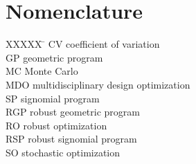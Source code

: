 \section*{Nomenclature}

\begin{tabbing}
  XXXXX \= \kill%
  CV \> coefficient of variation \\
  GP \> geometric program \\
  MC \> Monte Carlo \\
  MDO \> multidisciplinary design optimization \\
  SP \> signomial program \\
  RGP \> robust geometric program \\
  RO \> robust optimization \\
  RSP \> robust signomial program \\
  SO \> stochastic optimization \\
 \end{tabbing}

